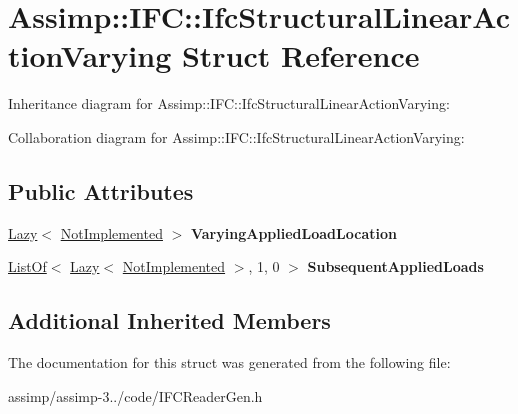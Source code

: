\hypertarget{struct_assimp_1_1_i_f_c_1_1_ifc_structural_linear_action_varying}{\section{Assimp\+:\+:I\+F\+C\+:\+:Ifc\+Structural\+Linear\+Action\+Varying Struct Reference}
\label{struct_assimp_1_1_i_f_c_1_1_ifc_structural_linear_action_varying}
}


Inheritance diagram for Assimp\+:\+:I\+F\+C\+:\+:Ifc\+Structural\+Linear\+Action\+Varying\+:


Collaboration diagram for Assimp\+:\+:I\+F\+C\+:\+:Ifc\+Structural\+Linear\+Action\+Varying\+:
\subsection*{Public Attributes}
\begin{DoxyCompactItemize}
\item 
\hypertarget{struct_assimp_1_1_i_f_c_1_1_ifc_structural_linear_action_varying_a412cc73953b181c9447bf0079b1f60a2}{\hyperlink{struct_assimp_1_1_s_t_e_p_1_1_lazy}{Lazy}$<$ \hyperlink{struct_assimp_1_1_i_f_c_1_1_not_implemented}{Not\+Implemented} $>$ {\bfseries Varying\+Applied\+Load\+Location}}\label{struct_assimp_1_1_i_f_c_1_1_ifc_structural_linear_action_varying_a412cc73953b181c9447bf0079b1f60a2}

\item 
\hypertarget{struct_assimp_1_1_i_f_c_1_1_ifc_structural_linear_action_varying_a195d7df2a28b71874256419955fae621}{\hyperlink{struct_assimp_1_1_s_t_e_p_1_1_list_of}{List\+Of}$<$ \hyperlink{struct_assimp_1_1_s_t_e_p_1_1_lazy}{Lazy}$<$ \hyperlink{struct_assimp_1_1_i_f_c_1_1_not_implemented}{Not\+Implemented} $>$, 1, 0 $>$ {\bfseries Subsequent\+Applied\+Loads}}\label{struct_assimp_1_1_i_f_c_1_1_ifc_structural_linear_action_varying_a195d7df2a28b71874256419955fae621}

\end{DoxyCompactItemize}
\subsection*{Additional Inherited Members}


The documentation for this struct was generated from the following file\+:\begin{DoxyCompactItemize}
\item 
assimp/assimp-\/3../code/I\+F\+C\+Reader\+Gen.\+h\end{DoxyCompactItemize}
